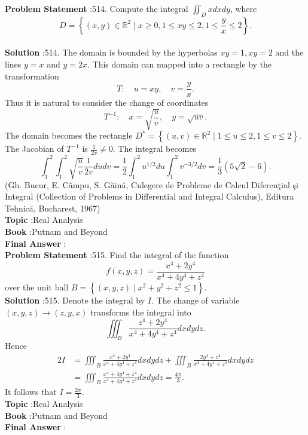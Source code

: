 \documentclass[10pt]{article}
\begin{document}
\textbf{Problem Statement} :514. Compute the integral $\iint_{D} x d x d y$, where$$ D=\left\{(x, y) \in \mathbb{R}^{2} \mid x \geq 0,1 \leq x y \leq 2,1 \leq \frac{y}{x} \leq 2\right\} . $$\\
\textbf{Solution} :514. The domain is bounded by the hyperbolas $x y=1, x y=2$ and the lines $y=x$ and $y=2 x$. This domain can mapped into a rectangle by the transformation$$ T: \quad u=x y, \quad v=\frac{y}{x} . $$Thus it is natural to consider the change of coordinates$$ T^{-1}: \quad x=\sqrt{\frac{u}{v}}, \quad y=\sqrt{u v} . $$The domain becomes the rectangle $D^{*}=\left\{(u, v) \in \mathbb{R}^{2} \mid 1 \leq u \leq 2,1 \leq v \leq 2\right\}$. The Jacobian of $T^{-1}$ is $\frac{1}{2 v} \neq 0$. The integral becomes$$ \int_{1}^{2} \int_{1}^{2} \sqrt{\frac{u}{v}} \frac{1}{2 v} d u d v=\frac{1}{2} \int_{1}^{2} u^{1 / 2} d u \int_{1}^{2} v^{-3 / 2} d v=\frac{1}{3}(5 \sqrt{2}-6) . $$(Gh. Bucur, E. Câmpu, S. Găină, Culegere de Probleme de Calcul Diferenţial şi Integral (Collection of Problems in Differential and Integral Calculus), Editura Tehnică, Bucharest, 1967)\\
\textbf{Topic} :Real Analysis\\
\textbf{Book} :Putnam and Beyond\\
\textbf{Final Answer} :\\


\textbf{Problem Statement} :515. Find the integral of the function$$ f(x, y, z)=\frac{x^{4}+2 y^{4}}{x^{4}+4 y^{4}+z^{4}} $$over the unit ball $B=\left\{(x, y, z) \mid x^{2}+y^{2}+z^{2} \leq 1\right\}$.\\
\textbf{Solution} :515. Denote the integral by $I$. The change of variable $(x, y, z) \rightarrow(z, y, x)$ transforms the integral into$$ \iiint_{B} \frac{z^{4}+2 y^{4}}{x^{4}+4 y^{4}+z^{4}} d x d y d z . $$Hence$$ \begin{aligned} 2 I &=\iiint_{B} \frac{x^{4}+2 y^{4}}{x^{4}+4 y^{4}+z^{4}} d x d y d z+\iiint_{B} \frac{2 y^{4}+z^{4}}{x^{4}+4 y^{4}+z^{4}} d x d y d z \\ &=\iiint_{B} \frac{x^{4}+4 y^{4}+z^{4}}{x^{4}+4 y^{4}+z^{4}} d x d y d z=\frac{4 \pi}{3} . \end{aligned} $$It follows that $I=\frac{2 \pi}{3}$.\\
\textbf{Topic} :Real Analysis\\
\textbf{Book} :Putnam and Beyond\\
\textbf{Final Answer} :\\
\end{document}
